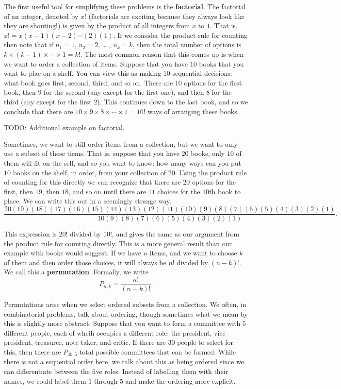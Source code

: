 \documentclass[
  letterpaper,
  DIV=11,
  numbers=noendperiod]{scrreprt}
\begin{document}
The first useful tool for simplifying these problems is the
\textbf{factorial}. The factorial of an integer, denoted by \(x!\)
(factorials are exciting because they always look like they are
shouting!) is given by the product of all integers from \(x\) to \(1\).
That is, \(x! = x(x-1)(x-2)\cdots(2)(1)\). If we consider the product
rule for counting then note that if \(n_1=1\), \(n_2=2\), \ldots{} ,
\(n_k = k\), then the total number of options is
\(k\times(k-1)\times\cdots\times 1 = k!\). The most common reason that
this comes up is when we want to order a collection of items. Suppose
that you have \(10\) books that you want to plae on a shelf. You can
view this as making \(10\) sequential decisions: what book goes first,
second, third, and so on. There are \(10\) options for the first book,
then \(9\) for the second (any except for the first one), and then \(8\)
for the third (any except for the first \(2\)). This continues down to
the last book, and so we conclude that there are
\(10\times9\times8\times\cdots\times1 = 10!\) ways of arranging these
books.

TODO: Additional example on factorial.

Sometimes, we want to still order items from a collection, but we want
to only use a subset of these tiems. That is, suppose that you have
\(20\) books, only \(10\) of them will fit on the self, and so you want
to know: how many ways can you put \(10\) books on the shelf, in order,
from your collection of \(20\). Using the product rule of counting for
this directly we can recognize that there are \(20\) options for the
first, then \(19\), then \(18\), and so on until there are \(11\)
choices for the \(10\)th book to place. We can write this out in a
seemingly strange way.
\[\frac{20(19)(18)(17)(16)(15)(14)(13)(12)(11)(10)(9)(8)(7)(6)(5)(4)(3)(2)(1)}{10(9)(8)(7)(6)(5)(4)(3)(2)(1)}.\]

This expression is \(20!\) divided by \(10!\), and gives the same as our
argument from the product rule for counting directly. This is a more
general result than our example with books would suggest. If we have
\(n\) items, and we want to choose \(k\) of them and then order those
choices, it will always be \(n!\) divided by \((n-k)!\). We call this a
\textbf{permutation}. Formally, we write
\[P_{n,k} = \frac{n!}{(n-k)!}.\]

Permutations arise when we select ordered subsets from a collection. We
often, in combinatorial problems, talk about ordering, though sometimes
what we mean by this is slightly more abstract. Suppose that you want to
form a committee with \(5\) different people, each of whcih occupies a
different role: the president, vice president, treasurer, note taker,
and critic. If there are \(30\) people to select for this, then there
are \(P_{30,5}\) total possible committees that can be formed. While
there is not a sequential order here, we talk about this as being
ordered since we can differentiate between the five roles. Instead of
labelling them with their names, we could label them \(1\) through \(5\)
and make the ordering more explicit.
\end{document}
